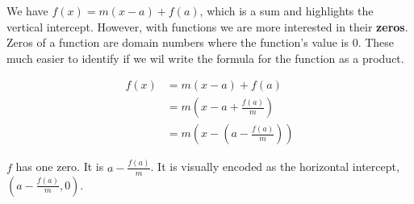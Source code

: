 \documentclass{ximera}
\begin{document}
We have $f(x) = m(x-a) + f(a)$, which is a sum and highlights the vertical intercept. However, with functions we are more interested in their \textbf{zeros}.  Zeros of a function are domain numbers where the function's value is $0$. These much easier to identify if we wil write the formula for the function as a product.


\begin{align*}
f(x) & = m(x-a) + f(a) \\
& = m \left(x - a + \frac{f(a)}{m}\right)  \\
& = m \left(x - \left(a - \frac{f(a)}{m}\right)\right) 
\end{align*}



$f$ has one zero.  It is $a - \frac{f(a)}{m}$.  It is visually encoded as the horizontal intercept, $\left(a - \frac{f(a)}{m}, 0\right)$.
\end{document}
